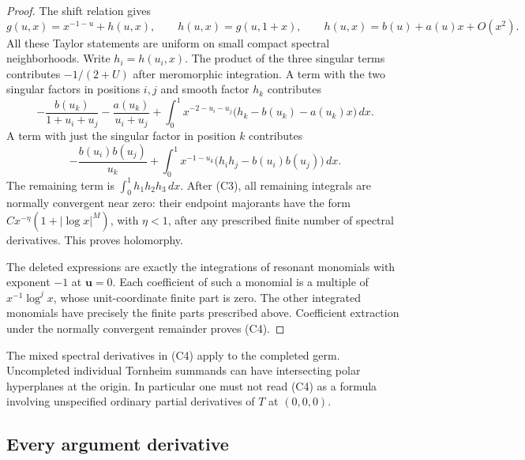\documentclass[11pt,letterpaper]{article}
\numberwithin{equation}{section}
\theoremstyle{definition}
\theoremstyle{remark}
\begin{document}
\begin{proof}
The shift relation gives
\[
 g(u,x)=x^{-1-u}+h(u,x),\qquad h(u,x)=g(u,1+x),
 \qquad h(u,x)=b(u)+a(u)x+O(x^2).
\]
All these Taylor statements are uniform on small compact spectral
neighborhoods.  Write $h_i=h(u_i,x)$.  The product of the three singular
terms contributes $-1/(2+U)$ after meromorphic integration. A term with
the two singular factors in positions $i,j$ and smooth factor $h_k$
contributes
\[
 -\frac{b(u_k)}{1+u_i+u_j}-\frac{a(u_k)}{u_i+u_j}
 +\int_0^1x^{-2-u_i-u_j}
             \bigl(h_k-b(u_k)-a(u_k)x\bigr)\,dx.
\]
A term with just the singular factor in position $k$ contributes
\[
 -\frac{b(u_i)b(u_j)}{u_k}
 +\int_0^1x^{-1-u_k}\bigl(h_i h_j-b(u_i)b(u_j)\bigr)\,dx.
\]
The remaining term is $\int_0^1h_1h_2h_3\,dx$.
After (C3), all remaining integrals are normally convergent near zero:
their endpoint majorants have the form
$Cx^{-\eta}(1+|\log x|^M)$, with $\eta<1$, after any prescribed finite
number of spectral derivatives.  This proves holomorphy.

The deleted expressions are exactly the integrations of resonant
monomials with exponent $-1$ at $\boldsymbol u=0$. Each coefficient of
such a monomial is a multiple of $x^{-1}\log^j x$, whose unit-coordinate
finite part is zero. The other integrated monomials have precisely the
finite parts prescribed above. Coefficient extraction under the
normally convergent remainder proves (C4).
\end{proof}

The mixed spectral derivatives in (C4) apply to the completed germ.
Uncompleted individual Tornheim summands can have intersecting polar
hyperplanes at the origin. In particular one must not read (C4) as a
formula involving unspecified ordinary partial derivatives of
$T$ at $(0,0,0)$.

\subsection{Every argument derivative}
\end{document}

